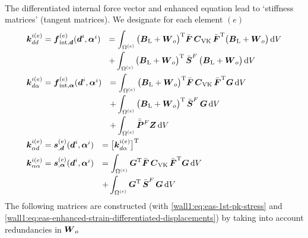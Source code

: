 \\
The differentiated internal force vector and enhanced equation lead to
`stiffness matrices' (tangent matrices). We designate for each element $(e)$
\begin{align}
&
\begin{array}{rl}
  \boldsymbol{k}_{dd}^{i(e)}
  = \boldsymbol{f}_{\text{int},\boldsymbol{d}}^{(e)}(\boldsymbol{d}^i,\boldsymbol{\alpha}^i)
& = \displaystyle\int_{\Omega^{(e)}}
    \big( \boldsymbol{B}_{\text{L}} + \boldsymbol{W}_o \big)^{\mathrm{T}} 
    \bar{\boldsymbol{F}} \, \boldsymbol{C}_{\text{VK}} \, \bar{\boldsymbol{F}}^{\mathrm{T}}
    \big( \boldsymbol{B}_{\text{L}} + \boldsymbol{W}_o \big)
    \, \mathrm{d} V
\\[2ex]
& + \displaystyle\int_{\Omega^{(e)}}
    \big( \boldsymbol{B}_{\text{L}} + \boldsymbol{W}_o \big)^{\mathrm{T}}
    \, \bar{\boldsymbol{S}}^F \,
    \big( \boldsymbol{B}_{\text{L}} + \boldsymbol{W}_o \big)
    \, \mathrm{d} V
\end{array}
\\
&
\begin{array}{rl}
  \boldsymbol{k}_{d\alpha}^{i(e)}
  = \boldsymbol{f}_{\text{int},\boldsymbol{\alpha}}^{(e)}(\boldsymbol{d}^i,\boldsymbol{\alpha}^i)
& = \displaystyle\int_{\Omega^{(e)}}
    \big( \boldsymbol{B}_{\text{L}} + \boldsymbol{W}_o \big)^{\mathrm{T}} 
    \bar{\boldsymbol{F}} \, \boldsymbol{C}_{\text{VK}} \, \bar{\boldsymbol{F}}^{\mathrm{T}}
    \boldsymbol{G}
    \, \mathrm{d} V
\\[2ex]
& + \displaystyle\int_{\Omega^{(e)}}
    \big( \boldsymbol{B}_{\text{L}} + \boldsymbol{W}_o \big)^{\mathrm{T}}
    \, \bar{\boldsymbol{S}}^F \,
    \boldsymbol{G}
    \, \mathrm{d} V
\\[2ex]
& + \displaystyle\int_{\Omega^{(e)}}
    \bar{\bar{\boldsymbol{P}}}^F \boldsymbol{Z}
    \, \mathrm{d} V
\end{array}
\\
&
\begin{array}{rl}
  \boldsymbol{k}_{\alpha d}^{i(e)}
  = \boldsymbol{s}_{,\boldsymbol{d}}^{(e)}(\boldsymbol{d}^i,\boldsymbol{\alpha}^i)
&  = \big[ \boldsymbol{k}_{d\alpha}^{i(e)} \big]^{\mathrm{T}}
\end{array}
\\
&
\begin{array}{rl}
  \boldsymbol{k}_{\alpha\alpha}^{i(e)}
  = \boldsymbol{s}_{,\boldsymbol{\alpha}}^{(e)}(\boldsymbol{d}^i,\boldsymbol{\alpha}^i)
& = \displaystyle\int_{\Omega^{(e)}}
    \boldsymbol{G}^{\mathrm{T}}
    \bar{\boldsymbol{F}} \, \boldsymbol{C}_{\text{VK}} \, \bar{\boldsymbol{F}}^{\mathrm{T}}
    \boldsymbol{G}
    \, \mathrm{d} V
\\[2ex]
& + \displaystyle\int_{\Omega^{(e)}}
    \boldsymbol{G}^{\mathrm{T}}
    \, \bar{\boldsymbol{S}}^F \,
    \boldsymbol{G}
    \, \mathrm{d} V
\end{array}
\end{align}
The following matrices are constructed (with \eqref{wall1:eq:eas-1st-pk-stress} and
\eqref{wall1:eq:eas-enhanced-strain-differentiated-displacements}) by taking into
account redundancies in $\boldsymbol{W}_o$
